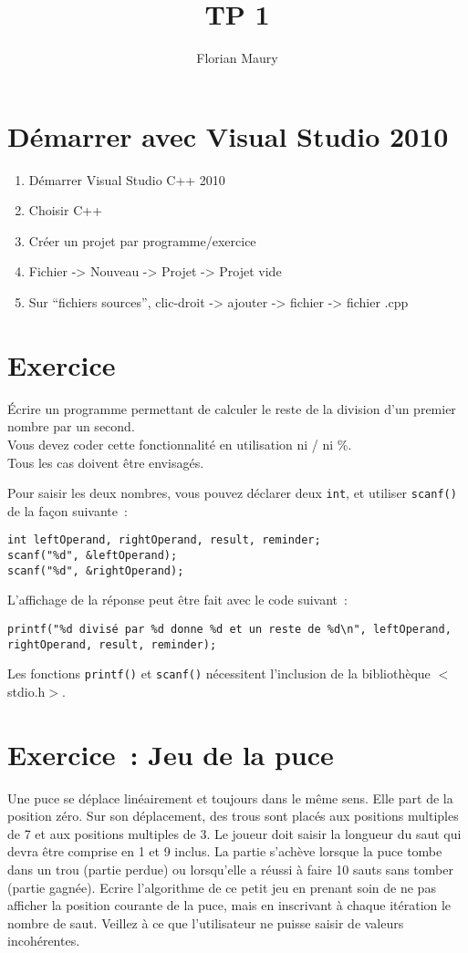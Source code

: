 \documentclass[11pt]{article}
\title{TP 1}
\author{Florian Maury}
\begin{document}
\maketitle

\section{Démarrer avec Visual Studio 2010}
\begin{enumerate}
  \item Démarrer Visual Studio C++ 2010
  \item Choisir C++
  \item Créer un projet par programme/exercice
  \item Fichier -> Nouveau -> Projet -> Projet vide
  \item Sur ``fichiers sources'', clic-droit -> ajouter -> fichier -> fichier .cpp
\end{enumerate}

\section{Exercice}
\'Ecrire un programme permettant de calculer le reste de la division d'un premier nombre par un second. \\
Vous devez coder cette fonctionnalité en utilisation ni / ni \%. \\
Tous les cas doivent être envisagés.
\par
Pour saisir les deux nombres, vous pouvez déclarer deux \verb|int|, et utiliser \verb|scanf()| de la façon suivante~:
\begin{verbatim}
int leftOperand, rightOperand, result, reminder;
scanf("%d", &leftOperand);
scanf("%d", &rightOperand);
\end{verbatim}
\par
L'affichage de la réponse peut être fait avec le code suivant~:
\begin{verbatim}
printf("%d divisé par %d donne %d et un reste de %d\n", leftOperand, rightOperand, result, reminder);
\end{verbatim}

Les fonctions \verb|printf()| et \verb|scanf()| nécessitent l'inclusion de la bibliothèque $<$stdio.h$>$.

\section{Exercice~: Jeu de la puce}
Une puce se déplace linéairement et toujours dans le même sens. Elle part de la position zéro. Sur son déplacement, des trous sont placés aux positions multiples de 7 et aux positions multiples de 3. Le joueur doit saisir la longueur du saut qui devra être comprise en 1 et 9 inclus.
La partie s’achève lorsque la puce tombe dans un trou (partie perdue) ou lorsqu’elle a réussi à faire 10 sauts sans tomber (partie gagnée).
Ecrire l’algorithme de ce petit jeu en prenant soin de ne pas afficher la position courante de la puce, mais en inscrivant à chaque itération le nombre de saut. Veillez à ce que l’utilisateur ne puisse saisir de valeurs incohérentes.
\end{document}
